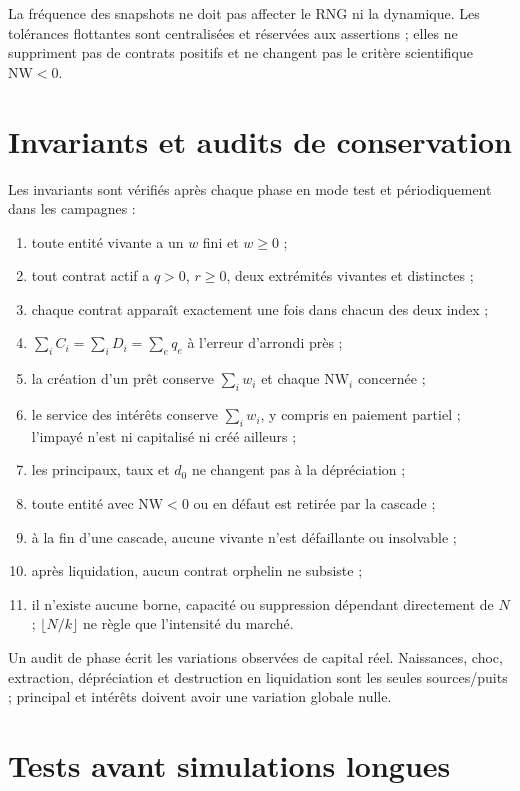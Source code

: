 \documentclass[11pt,a4paper]{article}
\newcommand{\NW}{\mathrm{NW}}
\begin{document}
La fréquence des snapshots ne doit pas affecter le RNG ni la dynamique. Les
tolérances flottantes sont centralisées et réservées aux assertions ; elles ne
suppriment pas de contrats positifs et ne changent pas le critère scientifique
$\NW<0$.

\section{Invariants et audits de conservation}

Les invariants sont vérifiés après chaque phase en mode test et périodiquement
dans les campagnes :
\begin{enumerate}
  \item toute entité vivante a un $w$ fini et $w\geq0$ ;
  \item tout contrat actif a $q>0$, $r\geq0$, deux extrémités vivantes et
  distinctes ;
  \item chaque contrat apparaît exactement une fois dans chacun des deux index ;
  \item $\sum_i C_i=\sum_i D_i=\sum_e q_e$ à l'erreur d'arrondi près ;
  \item la création d'un prêt conserve $\sum_iw_i$ et chaque $\NW_i$ concernée ;
  \item le service des intérêts conserve $\sum_iw_i$, y compris en paiement
  partiel ; l'impayé n'est ni capitalisé ni créé ailleurs ;
  \item les principaux, taux et $d_0$ ne changent pas à la dépréciation ;
  \item toute entité avec $\NW<0$ ou en défaut est retirée par la cascade ;
  \item à la fin d'une cascade, aucune vivante n'est défaillante ou insolvable ;
  \item après liquidation, aucun contrat orphelin ne subsiste ;
  \item il n'existe aucune borne, capacité ou suppression dépendant directement
  de $N$ ; $\lfloor N/k\rfloor$ ne règle que l'intensité du marché.
\end{enumerate}

Un audit de phase écrit les variations observées de capital réel. Naissances,
choc, extraction, dépréciation et destruction en liquidation sont les seules
sources/puits ; principal et intérêts doivent avoir une variation globale nulle.

\section{Tests avant simulations longues}
\end{document}
